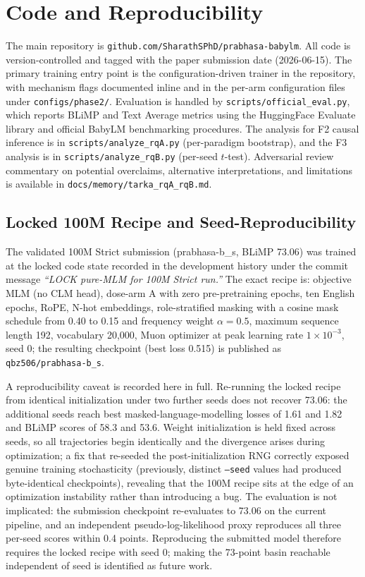 \section{Code and Reproducibility}

The main repository is \texttt{github.com/SharathSPhD/prabhasa-babylm}. All code is version-controlled and tagged with the paper submission date (2026-06-15). The primary training entry point is the configuration-driven trainer in the repository, with mechanism flags documented inline and in the per-arm configuration files under \texttt{configs/phase2/}. Evaluation is handled by \texttt{scripts/official\_eval.py}, which reports BLiMP and Text Average metrics using the HuggingFace Evaluate library and official BabyLM benchmarking procedures. The analysis for F2 causal inference is in \texttt{scripts/analyze\_rqA.py} (per-paradigm bootstrap), and the F3 analysis is in \texttt{scripts/analyze\_rqB.py} (per-seed $t$-test). Adversarial review commentary on potential overclaims, alternative interpretations, and limitations is available in \texttt{docs/memory/tarka\_rqA\_rqB.md}.

\subsection{Locked 100M Recipe and Seed-Reproducibility}

The validated 100M Strict submission (prabhasa-b\_s, BLiMP 73.06) was trained at the locked code state recorded in the development history under the commit message \emph{``LOCK pure-MLM for 100M Strict run.''} The exact recipe is: objective MLM (no CLM head), dose-arm A with zero pre-pretraining epochs, ten English epochs, RoPE, N-hot embeddings, role-stratified masking with a cosine mask schedule from 0.40 to 0.15 and frequency weight $\alpha=0.5$, maximum sequence length 192, vocabulary 20{,}000, Muon optimizer at peak learning rate $1\times10^{-3}$, seed 0; the resulting checkpoint (best loss 0.515) is published as \texttt{qbz506/prabhasa-b\_s}.

A reproducibility caveat is recorded here in full. Re-running the locked recipe from identical initialization under two further seeds does not recover 73.06: the additional seeds reach best masked-language-modelling losses of 1.61 and 1.82 and BLiMP scores of 58.3 and 53.6. Weight initialization is held fixed across seeds, so all trajectories begin identically and the divergence arises during optimization; a fix that re-seeded the post-initialization RNG correctly exposed genuine training stochasticity (previously, distinct \texttt{--seed} values had produced byte-identical checkpoints), revealing that the 100M recipe sits at the edge of an optimization instability rather than introducing a bug. The evaluation is not implicated: the submission checkpoint re-evaluates to 73.06 on the current pipeline, and an independent pseudo-log-likelihood proxy reproduces all three per-seed scores within 0.4 points. Reproducing the submitted model therefore requires the locked recipe with seed 0; making the 73-point basin reachable independent of seed is identified as future work.

